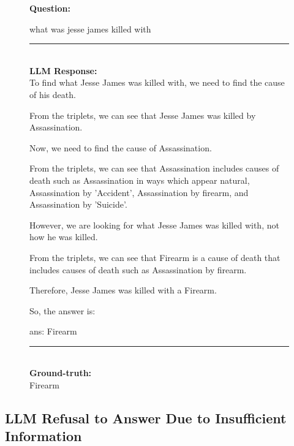 \begin{figure}
\begin{tcolorbox}[colback=gray!5!white, colframe=gray!75!black, title=WebQSP-WebQTest-62]
\scriptsize

\textbf{Question:}\\
\raggedright what was jesse james killed with

\rule{\linewidth}{0.4pt}
\\
\textbf{LLM Response:}\\
To find what Jesse James was killed with, we need to find the cause of his death.



From the triplets, we can see that Jesse James was killed by Assassination.



Now, we need to find the cause of Assassination.



From the triplets, we can see that Assassination includes causes of death such as Assassination in ways which appear natural, Assassination by 'Accident', Assassination by firearm, and Assassination by 'Suicide'.



However, we are looking for what Jesse James was killed with, not how he was killed. 



From the triplets, we can see that Firearm is a cause of death that includes causes of death such as Assassination by firearm.



Therefore, Jesse James was killed with a Firearm.



So, the answer is:



ans: Firearm

\rule{\linewidth}{0.4pt}
\\
\textbf{Ground-truth:}\\
Firearm

\end{tcolorbox}
\end{figure}


\clearpage
\subsection{LLM Refusal to Answer Due to Insufficient Information}
\label{appx:refusal}



